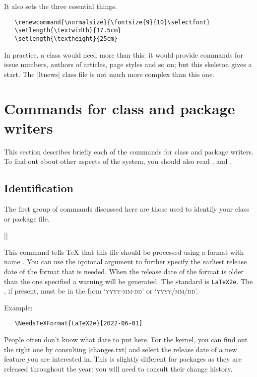 \documentclass{ltxguide}
\begin{document}
It also sets the three essential things.
\begin{verbatim}
   \renewcommand{\normalsize}{\fontsize{9}{10}\selectfont}
   \setlength{\textwidth}{17.5cm}
   \setlength{\textheight}{25cm}
\end{verbatim}
In practice, a class would need more than this: it would provide commands for
issue numbers, authors of articles, page styles and so on; but this skeleton
gives a start. The |ltnews| class file is not much more complex than this one.

\section{Commands for class and package writers}
\label{sec:commands}

This section describes briefly each of the commands for class and package
writers. To find out about other aspects of the system,
you should also read \emph{\LaTeXbook}, \emph{\LaTeXcomp} and
\emph{\usrguide}.

\subsection{Identification}

The first group of commands discussed here are those used to identify your
class or package file.

\begin{decl}
|\NeedsTeXFormat|  
\end{decl}
This command tells \TeX{} that this file should be processed using a format
with name . You can use the optional argument 
to further specify the earliest release date of the format that is needed. When
the release date of the format is older than the one specified a warning will
be generated. The standard  is \texttt{LaTeX2e}. The
, if
present, must be in the form `\textsc{yyyy-mm-dd}' or
`\textsc{yyyy/mm/dd}'.

Example:
\begin{verbatim}
   \NeedsTeXFormat{LaTeX2e}[2022-06-01]
\end{verbatim}
People often don't know what date to put here. For the kernel, you can find out
the right one by consulting |changes.txt| and select the release date of a new
feature you are interested in. This is slightly different for packages as they
are released throughout the year: you will need to consult their change
history.
\end{document}
